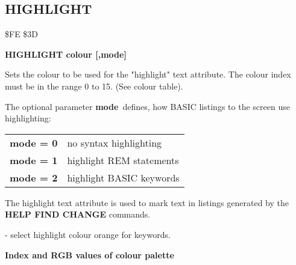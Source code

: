 
\newpage
\subsection{HIGHLIGHT}
\begin{description}[leftmargin=2cm,style=nextline]
\item [Token:] \$FE \$3D
\item [Format:] {\bf HIGHLIGHT colour [,mode]}
\item [Usage:] Sets the colour
               to be used for the "highlight" text attribute.
               The colour index must be in the
               range 0 to 15. (See colour table).

               The optional parameter {\bf mode} defines, how
               BASIC listings to the screen use highlighting:

{\ttfamily
\begin{tabular}{|l|l|}
\hline
   {\bf mode = 0}    &  no syntax highlighting \\
   {\bf mode = 1}    &  highlight REM statements \\
   {\bf mode = 2}    &  highlight BASIC keywords \\
\hline
\end{tabular}
}

\item [Remarks:] The highlight text attribute is used to mark text
               in listings generated by the {\bf HELP FIND CHANGE}
               commands.
\item [Example:]  - select highlight colour orange
                 for keywords.
\item [Colours:] {\bf Index and RGB values of colour palette}


\end{description}
